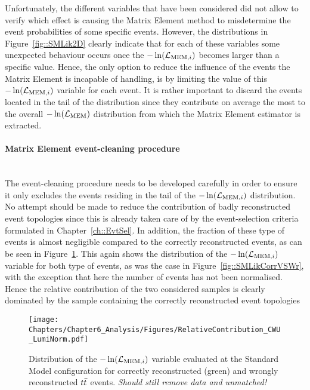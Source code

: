 Unfortunately, the different variables that have been considered did not allow to verify which effect is causing the Matrix Element method to misdetermine the event probabilities of some specific events.
However, the distributions in Figure~\ref{fig::SMLik2D} clearly indicate that for each of these variables some unexpected behaviour occurs once the $-\ln(\mathcal{L}_{\textrm{MEM}, i})$ becomes larger than a specific value.
Hence, the only option to reduce the influence of the events the Matrix Element is incapable of handling, is by limiting the value of this $-\ln(\mathcal{L}_{\textrm{MEM}, i})$ variable for each event.
It is rather important to discard the events located in the tail of the distribution since they contribute on average the most to the overall $-\ln(\mathcal{L}_{\textrm{MEM}})$ distribution from which the Matrix Element estimator is extracted.

\paragraph{Matrix Element event-cleaning procedure} \hfill \\

The event-cleaning procedure needs to be developed carefully in order to ensure it only excludes the events residing in the tail of the $-\ln(\mathcal{L}_{\textrm{MEM}, i})$ distribution.
No attempt should be made to reduce the contribution of badly reconstructed event topologies since this is already taken care of by the event-selection criteria formulated in Chapter~\ref{ch::EvtSel}.
In addition, the fraction of these type of events is almost negligible compared to the correctly reconstructed events, as can be seen in Figure~\ref{fig::SMLikCorrVSWrUnSc}. 
This again shows the distribution of the $-\ln(\mathcal{L}_{\textrm{MEM}, i})$ variable for both type of events, as was the case in Figure~\ref{fig::SMLikCorrVSWr}, with the exception that here the number of events has not been normalised.
Hence the relative contribution of the two considered samples is clearly dominated by the sample containing the correctly reconstructed event topologies
\\
\begin{figure}[h!t]
 \centering
 \texttt{[image: Chapters/Chapter6\_Analysis/Figures/RelativeContribution\_CWU\_LumiNorm.pdf]}
 \caption{Distribution of the $-\ln(\mathcal{L}_{\textrm{MEM}, i})$ variable evaluated at the Standard Model configuration for correctly reconstructed (green) and wrongly reconstructed $t\bar{t}$ events. \textit{Should still remove data and unmatched!}} \label{fig::SMLikCorrVSWrUnSc}
\end{figure}

